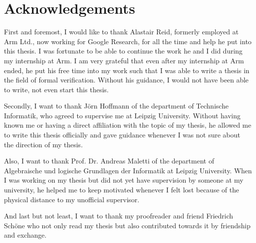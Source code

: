 \chapter*{\centering Acknowledgements}

First and foremost, I would like to thank Alastair Reid, formerly employed at Arm Ltd., now working for Google Research, for all the time and help he put into this thesis.
I was fortunate to be able to continue the work he and I did during my internship at Arm.
I am very grateful that even after my internship at Arm ended, he put his free time into my work such that I was able to write a thesis in the field of formal verification.
Without his guidance, I would not have been able to write, not even start this thesis.

Secondly, I want to thank Jörn Hoffmann of the department of Technische Informatik, who agreed to supervise me at Leipzig University.
Without having known me or having a direct affiliation with the topic of my thesis, he allowed me to write this thesis officially and gave guidance whenever I was not sure about the direction of my thesis.

Also, I want to thank Prof. Dr. Andreas Maletti of the department of Algebraische und logische Grundlagen der Informatik at Leipzig University.
When I was working on my thesis but did not yet have supervision by someone at my university, he helped me to keep motivated whenever I felt lost because of the physical distance to my unofficial supervisor.

And last but not least, I want to thank my proofreader and friend Friedrich Schöne who not only read my thesis but also contributed towards it by friendship and exchange.
